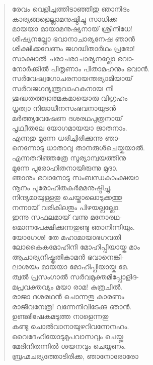 \begin{verse}
രേവം വെളിച്ചത്തിടാഞ്ഞിതു ഞാനിദം\\
കാര്യങ്ങളെല്ലാമനുഷ്ഠിച്ചു സാധിക്ക\\
മായയാ മായാമനുഷ്യനായ് ശ്രീനിധേ!\\
ശിഷ്യനല്ലോ ഭവാനാചാര്യനേഷ ഞാന്‍\\
ശിക്ഷിക്കവേണം ജഗദ്ധിതാര്‍ഥം പ്രഭോ!\\
സാക്ഷാല്‍ ചരാചരാചാര്യനല്ലോ ഭവാ-\\
നോര്‍ക്കില്‍ പിതൃണാം പിതാമഹനും ഭവാന്‍.\\
സര്‍വേഷ്വഗോചരനായന്തര്യാമിയായ്\\
സര്‍വജഗദ്യന്ത്രവാഹകനായ നീ\\
ശുദ്ധതത്ത്വാത്മകമായൊരു വിഗ്രഹം\\
ധൃത്വാ നിജാധീനസംഭവനായുടന്‍\\
മര്‍ത്ത്യവേഷേണ ദശരഥപുത്രനായ്\\
പൃഥ്വീതലേ യോഗമായയാ ജാതനാം.\\
എന്നതു മുന്നേ ധരിച്ചിരിക്കുന്നു ഞാ-\\
നെന്നോടു ധാതാവു താനരുള്‍ചെയ്കയാല്‍.\\
എന്നതറിഞ്ഞത്രേ സൂര്യാന്വയത്തിനു\\
മുന്നേ പുരോഹിതനായിരുന്നു മുദാ.\\
ഞാനും ഭവാനോടു സംബന്ധകാംക്ഷയാ\\
നൂനം പുരോഹിതകര്‍മമനുഷ്ഠിച്ചു.\\
നിന്ദ്യമായുള്ളതു ചെയ്താലൊടുക്കത്തു\\
നന്നായ് വരികിലതും പിഴയല്ലല്ലോ.\\
ഇന്നു സഫലമായ് വന്നു മനോരഥ-\\
മൊന്നപേക്ഷിക്കുന്നതുണ്ടു ഞാനിന്നിയും.\\
യോഗേശ! തേ മഹാമായാഭഗവതി\\
ലോകൈകമോഹിനി മോഹിപ്പിയായ്ക മാം\\
ആചാര്യനിഷ്കൃതികാമന്‍ ഭവാനെങ്കി-\\
ലാശയം മായയാ മോഹിപ്പിയായ്ക മേ.\\
ത്വല്‍ പ്രസംഗാല്‍ സര്‍വമുക്തമിപ്പോളിദ-\\
മപ്രവക്തവ്യം മയാ രാമ! കുത്രചില്‍.\\
രാജാ ദശരഥന്‍ ചൊന്നതു കാരണം\\
രാജീവനേത്ര! വന്നേനിവിടേക്കു ഞാന്‍.\\
ഉണ്ടഭിഷേകമടുത്ത നാളെന്നതു\\
കണ്ടു ചൊല്‍വാനായുഴറിവന്നേനഹം.\\
വൈദേഹിയോടുമുപവാസവും ചെയ്തു\\
മേദിനിതന്നില്‍ ശയനവും ചെയ്യണം.\\
ബ്രഹ്മചര്യത്തോടിരിക്ക, ഞാനോരോരോ\\

\end{verse}
